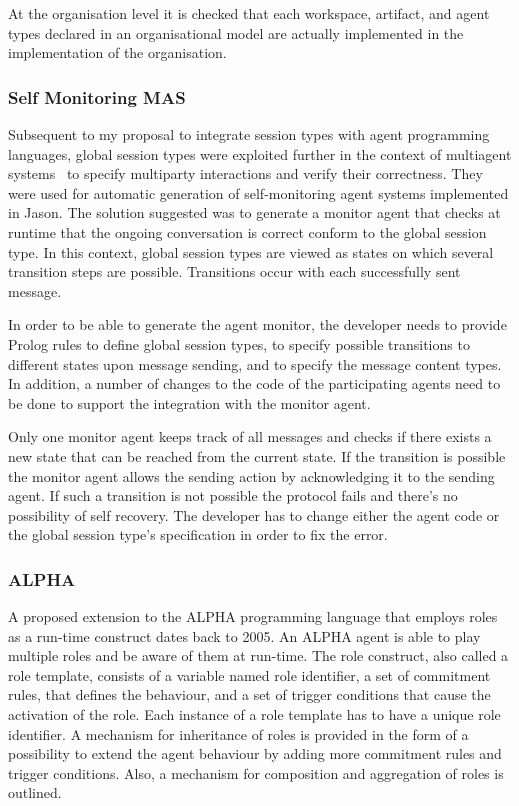\documentclass[a4paper,12pt,oneside,fleqn]{book} %
\begin{document}
{At the organisation level it is checked that each workspace, artifact, and
agent types declared in an organisational model are actually implemented in
the implementation of the organisation.

\subsubsection{Self Monitoring MAS} %
Subsequent to my proposal to integrate session types with agent programming
languages, global session types were exploited further in the context of
multiagent systems~\cite{DBLP:conf/dalt/AnconaDM12} to specify multiparty
interactions and verify their correctness. They were used for automatic
generation of self-monitoring agent systems implemented in Jason. The
solution suggested was to generate a monitor agent that checks at runtime
that the ongoing conversation is correct conform to the global session
type. In this context, global session types are viewed as states on which
several transition steps are possible. Transitions occur with each
successfully sent message.

In order to be able to generate the agent monitor, the developer needs to
provide Prolog rules to define global session types, to specify possible
transitions to different states upon message sending, and to specify the
message content types. In addition, a number of changes to the code of the
participating agents need to be done to support the integration with the
monitor agent.

Only one monitor agent keeps track of all messages and checks if there
exists a new state that can be reached from the current state. If the
transition is possible the monitor agent allows the sending action by
acknowledging it to the sending agent. If such a transition is not possible
the protocol fails and there's no possibility of self recovery.  The
developer has to change either the agent code or the global session type's
specification in order to fix the error.


\subsubsection{ALPHA} %
A proposed extension to the ALPHA programming language that employs roles
as a run-time construct dates back to 2005\cite{Collier_arole-based}. An
ALPHA agent is able to play multiple roles and be aware of them at
run-time. The role construct, also called a role template, consists of a
variable named role identifier, a set of commitment rules, that defines the
behaviour, and a set of trigger conditions that cause the activation of
the role. Each instance of a role template has to have a unique role
identifier. A mechanism for inheritance of roles is provided in the form of
a possibility to  extend the agent behaviour by adding more commitment
rules and trigger conditions.  Also, a mechanism for composition and
aggregation of roles is outlined.

}
\end{document}
